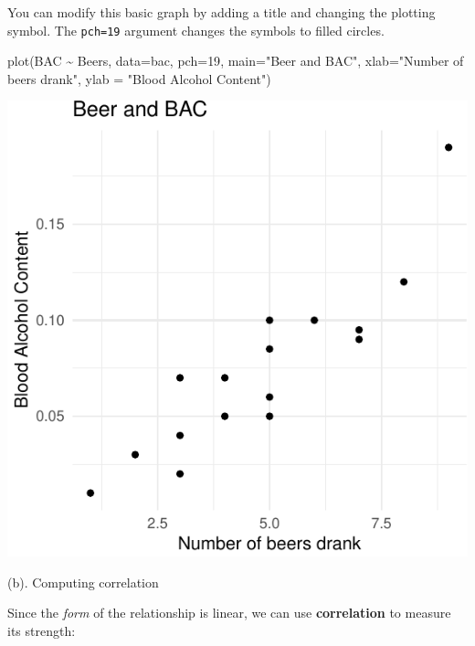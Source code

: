 \documentclass[
]{book}
\newenvironment{Shaded}{\begin{snugshade}}{\end{snugshade}}
\newcommand{\AttributeTok}[1]{\textcolor[rgb]{0.77,0.63,0.00}{#1}}
\newcommand{\DecValTok}[1]{\textcolor[rgb]{0.00,0.00,0.81}{#1}}
\newcommand{\FunctionTok}[1]{\textcolor[rgb]{0.00,0.00,0.00}{#1}}
\newcommand{\NormalTok}[1]{#1}
\newcommand{\SpecialCharTok}[1]{\textcolor[rgb]{0.00,0.00,0.00}{#1}}
\newcommand{\StringTok}[1]{\textcolor[rgb]{0.31,0.60,0.02}{#1}}
\begin{document}
You can modify this basic graph by adding a title and changing the plotting symbol. The \texttt{pch=19} argument changes the symbols to filled circles.

\begin{Shaded}
\begin{Highlighting}[]
\FunctionTok{plot}\NormalTok{(BAC }\SpecialCharTok{\textasciitilde{}}\NormalTok{ Beers, }\AttributeTok{data=}\NormalTok{bac, }\AttributeTok{pch=}\DecValTok{19}\NormalTok{, }
     \AttributeTok{main=}\StringTok{"Beer and BAC"}\NormalTok{, }\AttributeTok{xlab=}\StringTok{"Number of beers drank"}\NormalTok{, }\AttributeTok{ylab =} \StringTok{"Blood Alcohol Content"}\NormalTok{)}
\end{Highlighting}
\end{Shaded}

\includegraphics[width=1\linewidth]{Class_Activity_6_files/figure-latex/unnamed-chunk-3-1}

(b). Computing correlation

Since the \emph{form} of the relationship is linear, we can use \textbf{correlation} to measure its strength:

\begin{Shaded}
\end{Shaded}
\end{document}
